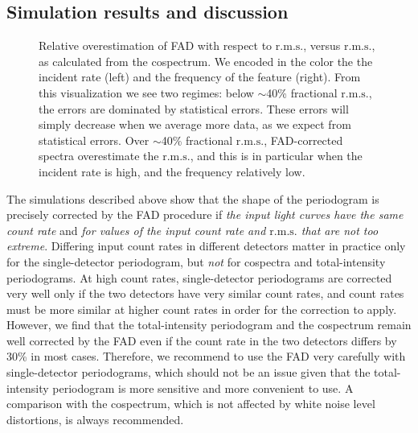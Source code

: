 \documentclass[twocolumn]{aastex61}
\newcommand{\rms}{\ensuremath{\mathrm{r.m.s.}}\xspace}
\begin{document}
\subsection{Simulation results and discussion}\label{sec:caveat}

\begin{figure*}
    \caption{Relative overestimation of FAD with respect to \rms, versus \rms, as calculated from the cospectrum.  
    We encoded in the color the  the incident rate (left) and the frequency of the feature (right).
    From this visualization we see two regimes: below $\sim$40\% fractional \rms, the errors are dominated by statistical errors. 
    These errors will simply decrease when we average more data, as we expect from statistical errors.
    Over $\sim$40\% fractional \rms, FAD-corrected spectra overestimate the \rms, and this is 
    in particular when the incident rate is high, and the frequency relatively low. }
    \label{fig:errors}
\end{figure*}

The simulations described above show that the shape of the periodogram is precisely corrected by the FAD procedure if \textit{the input light curves have the same count rate} and \textit{for values of the input count rate and \rms that are not too extreme}. Differing input count rates in different detectors matter in practice only for the single-detector periodogram, but \textit{not} for cospectra and total-intensity periodograms. 
At high count rates, single-detector periodograms are corrected very well only if the two detectors have very similar count rates, and count rates must be more similar at higher count rates in order for the correction to apply.
However, we find that the total-intensity periodogram and the cospectrum remain well corrected by the FAD even if the count rate in the two detectors differs by 30\% in most cases.
Therefore, we recommend to use the FAD very carefully with single-detector periodograms, which should not be an issue given that the total-intensity periodogram is more sensitive and more convenient to use. 
A comparison with the cospectrum, which is not affected by white noise level distortions, is always recommended. 
\end{document}
